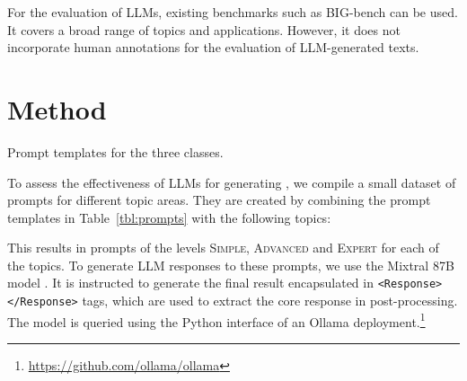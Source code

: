 \documentclass[11pt]{article}
\begin{document}
For the evaluation of LLMs, existing benchmarks such as BIG-bench \cite{srivastava2023} can be used. It covers a broad range of topics and applications. However, it does not incorporate human annotations for the evaluation of LLM-generated texts.


\section{Method}
\begin{table}\centering\small
  \caption{Prompt templates for the three classes.}
  \label{tbl:prompts}
\end{table}

To assess the effectiveness of LLMs for generating , we compile a small dataset of prompts for different topic areas. They are created by combining the prompt templates in Table~\ref{tbl:prompts} with the following topics:
\begin{itemize}[nosep]\setlength{\multicolsep}{5pt}
\begin{multicols}{2}
\end{multicols}
\end{itemize}

This results in prompts of the levels \textsc{Simple}, \textsc{Advanced} and \textsc{Expert} for each of the topics.
To generate LLM responses to these prompts, we use the Mixtral 8\texttimes 7B model \cite{jiang2024}. It is instructed to generate the final result encapsulated in \texttt{\textless{}Response\textgreater{}\textless{}/Response\textgreater{}} tags, which are used to extract the core response in post-processing. The model is queried using the Python interface of an Ollama deployment.\footnote{\url{https://github.com/ollama/ollama}}
\end{document}
